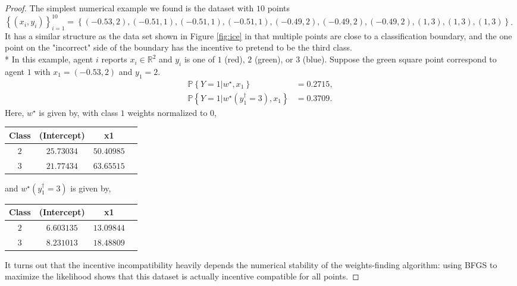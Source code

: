 \documentclass{article}
\begin{document}
\begin{proof} \label{proof:logitpf} 
The simplest numerical example we found is the dataset with $10$ points $\left\{\left(x_{i}, y_{i}\right)\right\}_{i=1}^{10} = \left\{\left(-0.53, 2\right), \left(-0.51, 1\right), \left(-0.51, 1\right), \left(-0.51, 1\right), \left(-0.49, 2\right), \left(-0.49, 2\right), \left(-0.49, 2\right), \left(1, 3\right), \left(1, 3\right), \left(1, 3\right)\right\}$. It has a similar structure as the data set shown in Figure \ref{fig:ice} in that multiple points are close to a classification boundary, and the one point on the "incorrect" side of the boundary has the incentive to pretend to be the third class.
\\* In this example, agent $i $ reports $x_{i} \in \mathbb{R}^{2}$ and $y_{i}$ is one of $1$ (red), $2$ (green), or $3$ (blue). Suppose the green square point correspond to agent $1$ with $x_{1} = \left(-0.53, 2\right)$ and $y_{1} = 2$.
\begin{align*}
\mathbb{P}\left\{Y = 1 | w^\star , x_{1}\right\} &= 0.2715,
\\ \mathbb{P}\left\{Y = 1 | w^\star \left(y^{\dagger}_{1} = 3\right), x_{1}\right\} &= 0.3709.
\end{align*}
Here, $w^\star $ is given by, with class $1$ weights normalized to $0$,

\begin{center} \begin{tabular}{|c|c|c|c|}
\hline
 Class &(Intercept) &x1\\ \hline
$2$ &$25.73034$ &$50.40985$\\ \hline
$3$ &$21.77434$ &$63.65515$\\ \hline
\end{tabular} \end{center}
and $w^\star \left(y^{\dagger}_{1} = 3\right)$ is given by,

\begin{center} \begin{tabular}{|c|c|c|c|}
\hline
 Class &(Intercept) &x1\\ \hline
$2$ &$6.603135$ &$13.09844$\\ \hline
$3$ &$8.231013$ &$18.48809$\\ \hline
\end{tabular} \end{center}
It turns out that the incentive incompatibility heavily depends the numerical stability of the weights-finding algorithm: using BFGS to maximize the likelihood shows that this dataset is actually incentive compatible for all points.
\newline \newline\end{proof}
\end{document}
